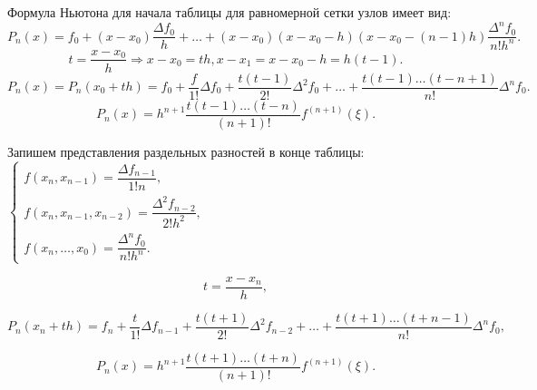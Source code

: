 Формула Ньютона для начала таблицы для равномерной сетки узлов имеет вид:
\begin{equation*}
  P_n(x) = f_0 + (x - x_0) \dfrac{\Delta f_0}{h} + \ldots + (x - x_0)(x - x_0 - h) (x - x_0 - (n-1)h) \dfrac{\Delta^n f_0}{n! h^n}.
\end{equation*}
\begin{equation*}
  t = \dfrac{x - x_0}{h} \Rightarrow x - x_0 = th, x - x_1 = x - x_0 - h = h(t-1).
\end{equation*}
\begin{equation*}
  P_n(x) = P_n (x_0 + th) = f_0 + \dfrac{f}{1!} \Delta f_0 + \dfrac{t (t-1)}{2!} \Delta^2 f_0 + \ldots + \dfrac{t (t-1) \ldots (t - n + 1)}{n!} \Delta^n f_0.
\end{equation*}
\begin{equation*}
  P_n(x) = h^{n+1} \dfrac{t(t-1)\ldots(t-n)}{(n+1)!} f^{(n+1)} (\xi).
\end{equation*}

Запишем представления раздельных разностей в конце таблицы:
$\begin{cases}
  f(x_n, x_{n-1}) = \dfrac{\Delta f_{n-1}}{1! n}, \\
  f(x_n, x_{n-1}, x_{n-2}) = \dfrac{\Delta^2 f_{n-2}}{2! h^2}, \\
  f(x_n, \ldots, x_0) = \dfrac{\Delta^n f_0}{n! h^n}.
\end{cases}$

\begin{equation*}
  t = \dfrac{x - x_n}{h},
\end{equation*}

\begin{equation*}
  P_n(x_n + th) = f_n + \dfrac{t}{1!} \Delta f_{n-1} + \dfrac{t (t + 1)}{2!} \Delta^2 f_{n-2} + \ldots + \dfrac{t (t + 1) \ldots (t + n - 1)}{n!} \Delta^n f_0,
\end{equation*}

\begin{equation*}
  P_n(x) = h^{n+1} \dfrac{t(t+1)\ldots (t+n)}{(n+1)!} f^{(n+1)} (\xi).
\end{equation*}
